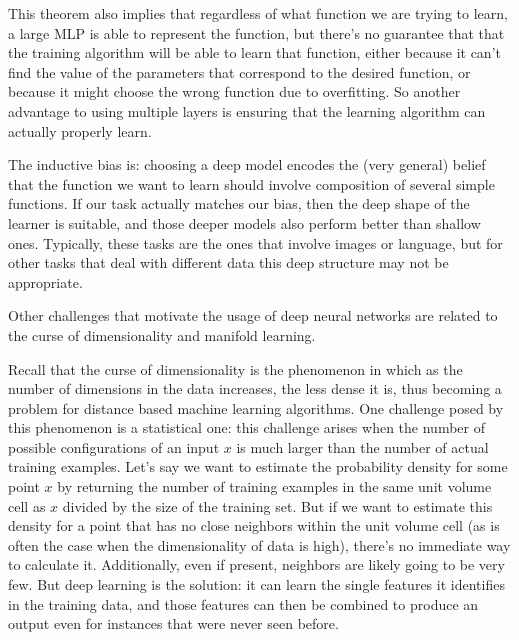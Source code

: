 This theorem also implies that regardless of what function we are trying to learn, a large MLP is able to represent the function, but there's no guarantee that that the training algorithm will be able to learn that function, either because it can't find the value of the parameters that correspond to the desired function, or because it might choose the wrong function due to overfitting. So another advantage to using multiple layers is ensuring that the learning algorithm can actually properly learn.

The inductive bias is: choosing a deep model encodes the (very general) belief that the function we want to learn should involve composition of several simple functions. If our task actually matches our bias, then the deep shape of the learner is suitable, and those deeper models also perform better than shallow ones. Typically, these tasks are the ones that involve images or language, but for other tasks that deal with different data this deep structure may not be appropriate.

Other challenges that motivate the usage of deep neural networks are related to the curse of dimensionality and manifold learning.

Recall that the curse of dimensionality is the phenomenon in which as the number of dimensions in the data increases, the less dense it is, thus becoming a problem for distance based machine learning algorithms. One challenge posed by this phenomenon is a statistical one: this challenge arises when the number of possible configurations of an input $x$ is much larger than the number of actual training examples. Let's say we want to estimate the probability density for some point $x$ by returning the number of training examples in the same unit volume cell as $x$ divided by the size of the training set. But if we want to estimate this density for a point that has no close neighbors within the unit volume cell (as is often the case when the dimensionality of data is high), there's no immediate way to calculate it. Additionally, even if present, neighbors are likely going to be very few. But deep learning is the solution: it can learn the single features it identifies in the training data, and those features can then be combined to produce an output even for instances that were never seen before.

